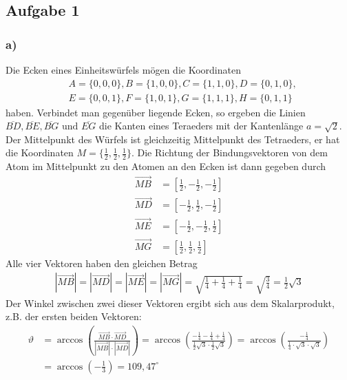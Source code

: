 \documentclass[11pt]{article}
\begin{document}
\subsection*{Aufgabe 1}

\subsubsection*{a)}Die Ecken eines Einheitswürfels mögen die Koordinaten
\begin{align*}
&A = \{0,0,0\}, B = \{1,0,0\}, C = \{1,1,0\}, D = \{0,1,0\},\\
&E = \{0,0,1\}, F = \{1,0,1\}, G = \{1,1,1\}, H = \{0,1,1\}
\end{align*}
haben. Verbindet man gegenüber liegende Ecken, so ergeben die Linien $\overline{BD}, \overline{BE}, \overline{BG} \text{ und } \overline{EG}$ die Kanten eines Teraeders mit der Kantenlänge $a = \sqrt{2}$. Der Mittelpunkt des Würfels ist gleichzeitig
Mittelpunkt des Tetraeders, er hat die Koordinaten
$M = \{\frac{1}{2}, \frac{1}{2}, \frac{1}{2}\}$. Die Richtung der Bindungsvektoren
von dem Atom im Mittelpunkt zu den Atomen an den Ecken ist dann gegeben durch
\begin{align*}
\overrightarrow{MB} &= \left[\frac{1}{2}, -\frac{1}{2}, -\frac{1}{2}\right]\\
\overrightarrow{MD} &= \left[-\frac{1}{2}, \frac{1}{2}, -\frac{1}{2}\right]\\
\overrightarrow{ME} &= \left[-\frac{1}{2}, -\frac{1}{2}, \frac{1}{2}\right]\\
\overrightarrow{MG} &= \left[\frac{1}{2}, \frac{1}{2}, \frac{1}{2}\right]
\end{align*}
Alle vier Vektoren haben den gleichen Betrag
\begin{align}
\label{eq-betrag}
\left|\overrightarrow{MB}\right| = \left|\overrightarrow{MD}\right| =
\left|\overrightarrow{ME}\right| = \left|\overrightarrow{MG}\right| =
\sqrt{\frac{1}{4}+\frac{1}{4}+\frac{1}{4}} = \sqrt{\frac{3}{4}} = \frac{1}{2} \sqrt{3}
\end{align}
Der Winkel zwischen zwei dieser Vektoren ergibt sich aus dem Skalarprodukt,
z.B. der ersten beiden Vektoren:
\begin{align*}
  \vartheta &= \arccos \left(\frac {\overrightarrow{MB} \cdot \overrightarrow{MD}}
  {\left|\overrightarrow{MB}\right| \cdot \left|\overrightarrow{MD}\right|} \right) =
  \arccos  \left(\frac{-\frac{1}{4}-\frac{1}{4}+\frac{1}{4}}
    {\frac{1}{2} \sqrt{3} \cdot \frac{1}{2} \sqrt{3}} \right)
    = \arccos \left(\frac{-\frac{1}{4}}{\frac{1}{4} \cdot  \sqrt{3} \cdot \sqrt{3}} \right)
    \\&= \arccos \left( -\frac{1}{3} \right) = 109,47^{\circ}
\end{align*}
\end{document}
